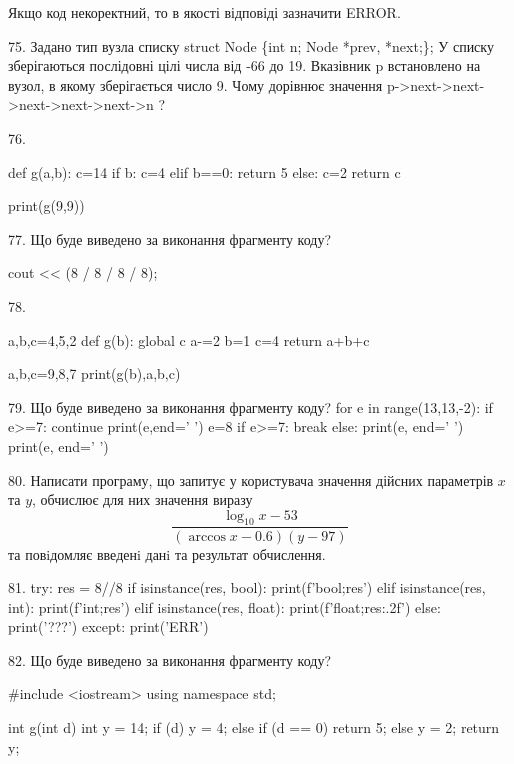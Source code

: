 \documentclass[11pt]{article}
\begin{document}
Якщо код некоректний, то в якості відповіді зазначити ERROR.




75. 
Задано тип вузла списку
struct Node \{int n; Node *prev, *next;\};
У списку зберігаються послідовні цілі числа від -66 до 19. Вказівник p встановлено на вузол, в якому зберігається число 9.
Чому дорівнює значення p->next->next->next->next->next->n ?

76. 

def g(a,b):
    c=14
    if b:
        c=4
    elif b==0:
         return 5
    else: 
        c=2
    return c

print(g(9,9))

77. Що буде виведено за виконання фрагменту коду?

cout << (8 / 8 / 8 / 8);


78. 

a,b,c=4,5,2
def g(b):
global c    a-=2
    b=1
    c=4
    return a+b+c

a,b,c=9,8,7
print(g(b),a,b,c)


79. Що буде виведено за виконання фрагменту коду?
for e in range(13,13,-2):
    if e>=7:
        continue
        print(e,end=' ')
        e=8
    if e>=7:
        break
else:
    print(e, end=' ')
print(e, end=' ')


80. 
Написати програму, що запитує у користувача значення дійсних параметрів $x$ та $y$, обчислює для них значення виразу 
$$\frac{\log_{10} x - 53}{(\arccos x - 0.6) (y - 97)}$$ 
та повiдомляє введенi данi та результат обчислення.



81. 
try:
    res = 8//8%
    if isinstance(res, bool):
        print(f'bool;{res}')
    elif isinstance(res, int):
        print(f'int;{res}')
    elif isinstance(res, float):
        print(f'float;{res:.2f}')
    else:
        print('???')
except:
    print('ERR')


82. Що буде виведено за виконання фрагменту коду?

#include <iostream>
using namespace std;

int g(int d){
    int y = 14;
    if (d) 
        y = 4;
    else if (d == 0)
         return 5;
    else
         y = 2;
    return y;
}
\end{document}
